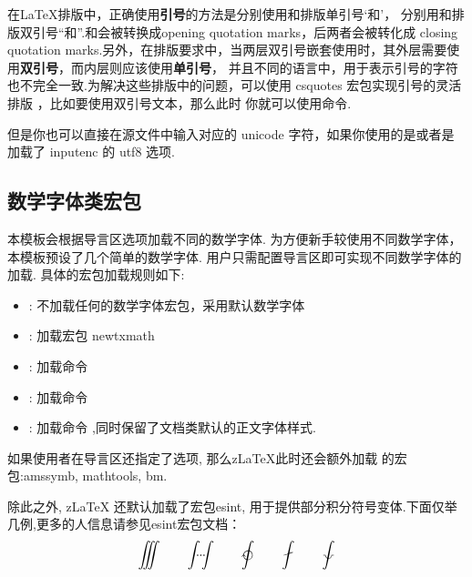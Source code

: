 在\LaTeX{}排版中，正确使用{\bf 引号}的方法是分别使用和排版单引号`和'，
分别用和排版双引号``和''.和会被转换成opening quotation marks，后两者会被转化成
closing quotation marks.另外，在排版要求中，当两层双引号嵌套使用时，其外层需要使用{\bf 双引号}，而内层则应该使用{\bf 单引号}，
并且不同的语言中，用于表示引号的字符也不完全一致.为解决这些排版中的问题，可以使用 {csquotes} 宏包实现引号的灵活排版
，比如要使用双引号文本，那么此时
你就可以使用命令.

\begin{remark}
但是你也可以直接在源文件中输入对应的 unicode 字符，如果你使用的是或者是加载了 inputenc 的 utf8 选项.
\end{remark}

\subsection{数学字体类宏包}
本模板会根据导言区选项加载不同的数学字体. 为方便新手较使用不同数学字体，本模板预设了几个简单的数学字体.
用户只需配置导言区即可实现不同数学字体的加载. 具体的宏包加载规则如下:
\begin{itemize}
    \item {}: 不加载任何的数学字体宏包，采用默认数学字体
    \item {}: 加载宏包 {newtxmath}
    \item {}: 加载命令 
    \item {}: 加载命令 \par
    \item {}: 加载命令 \cmd[F]{\RequirePackage{mathpazo}},同时保留了文档类默认的正文字体样式.
\end{itemize}

如果使用者在导言区还指定了选项, 那么z\LaTeX{}此时还会额外加载
的宏包:{amssymb, mathtools, bm}.

除此之外, z\LaTeX{} 还默认加载了宏包{esint}, 用于提供部分积分符号变体.下面仅举几例,更多的人信息请参见{esint}宏包文档：
\[
  \iiint\qquad 
  \idotsint\qquad
  \ointclockwise\qquad
  \fint\qquad
  \landdownint
\]

